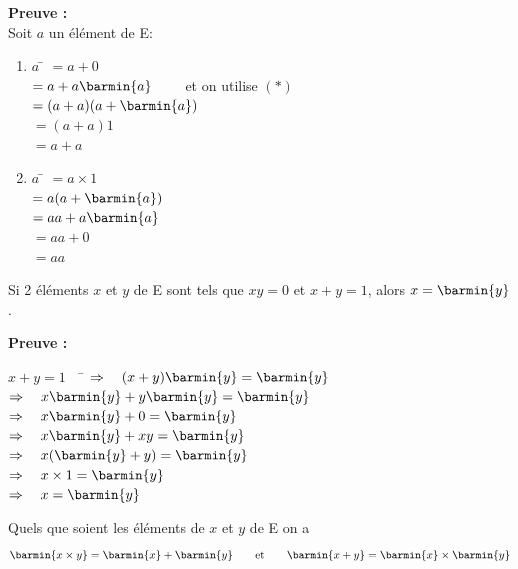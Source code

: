 \documentclass[a4paper,12pt,french]{book}
\begin{document}
	\textbf{Preuve :}\\

	Soit $a$ un élément de E:
	\begin{multicols}{2}
	\begin{enumerate}[\textbullet]
		\item 	\begin{tabbing}
			$a$ \= 	$=a+0$\\
				\>	$=a+a\barmin{a}\qquad$ et on utilise $(*)$\\
				\>	$=(a+a)(a+\barmin{a})$\\
				\>	$=(a+a)1$\\
				\>	$=a+a$
		\end{tabbing}
		\item 	\begin{tabbing}
			$a$ \= $=a\times 1$\\
				\> $=a(a+\barmin{a})$\\
				\> $=aa+a\barmin{a}$\\
				\> $=aa+0$\\
				\> $=aa$
		\end{tabbing}
	\end{enumerate}
	\end{multicols}
	\begin{propriete}
		Si 2 éléments $x$ et $y$ de E sont tels que $xy=0$ et $x+y=1$, alors $x=\barmin{y}$.
	\end{propriete}
\textbf{Preuve :}
\begin{tabbing}
	$x+y=1\quad$	\=	$\Rightarrow\quad (x+y)\barmin{y}=\barmin{y}$\\
					\>	$\Rightarrow\quad x\barmin{y}+y\barmin{y}=\barmin{y}$\\
					\>	$\Rightarrow\quad x\barmin{y}+0=\barmin{y}$\\
					\>	$\Rightarrow\quad x\barmin{y}+xy=\barmin{y}$\\
					\>	$\Rightarrow\quad x(\barmin{y}+y)=\barmin{y}$\\
					\>	$\Rightarrow\quad x\times 1=\barmin{y}$\\
					\>	$\Rightarrow\quad x=\barmin{y}$
\end{tabbing}

	\begin{propriete}
		Quels que soient les éléments de $x$ et $y$ de E on a $$\barmin{x\times y}=\barmin{x}+\barmin{y}  \qquad\textrm{et}\qquad \barmin{x+y}=\barmin{x}\times\barmin{y}$$
	\end{propriete}
\end{document}
